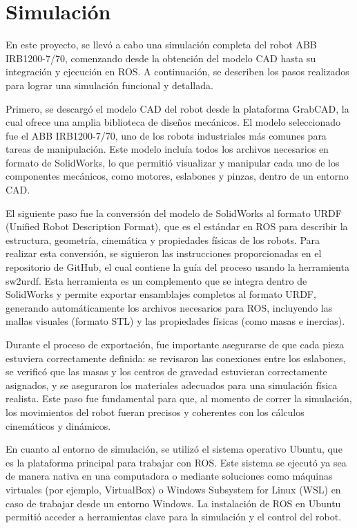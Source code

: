 \section{Simulación} \label{sec:simulacion}
En este proyecto, se llevó a cabo una simulación completa del robot ABB IRB1200-7/70, comenzando desde la obtención del modelo CAD hasta su integración y ejecución en ROS. A continuación, se describen los pasos realizados para lograr una simulación funcional y detallada.

Primero, se descargó el modelo CAD del robot desde la plataforma GrabCAD, la cual ofrece una amplia biblioteca de diseños mecánicos. El modelo seleccionado fue el ABB IRB1200-7/70, uno de los robots industriales más comunes para tareas de manipulación. Este modelo incluía todos los archivos necesarios en formato de SolidWorks, lo que permitió visualizar y manipular cada uno de los componentes mecánicos, como motores, eslabones y pinzas, dentro de un entorno CAD.

El siguiente paso fue la conversión del modelo de SolidWorks al formato URDF (Unified Robot Description Format), que es el estándar en ROS para describir la estructura, geometría, cinemática y propiedades físicas de los robots. Para realizar esta conversión, se siguieron las instrucciones proporcionadas en el repositorio de GitHub, el cual contiene la guía del proceso usando la herramienta sw2urdf. Esta herramienta es un complemento que se integra dentro de SolidWorks y permite exportar ensamblajes completos al formato URDF, generando automáticamente los archivos necesarios para ROS, incluyendo las mallas visuales (formato STL) y las propiedades físicas (como masas e inercias).

Durante el proceso de exportación, fue importante asegurarse de que cada pieza estuviera correctamente definida: se revisaron las conexiones entre los eslabones, se verificó que las masas y los centros de gravedad estuvieran correctamente asignados, y se aseguraron los materiales adecuados para una simulación física realista. Este paso fue fundamental para que, al momento de correr la simulación, los movimientos del robot fueran precisos y coherentes con los cálculos cinemáticos y dinámicos.

En cuanto al entorno de simulación, se utilizó el sistema operativo Ubuntu, que es la plataforma principal para trabajar con ROS. Este sistema se ejecutó ya sea de manera nativa en una computadora o mediante soluciones como máquinas virtuales (por ejemplo, VirtualBox) o Windows Subsystem for Linux (WSL) en caso de trabajar desde un entorno Windows. La instalación de ROS en Ubuntu permitió acceder a herramientas clave para la simulación y el control del robot.

